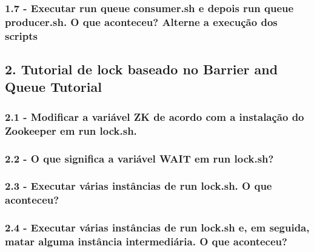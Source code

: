\subsubsection{1.7 - Executar run queue consumer.sh e depois run queue producer.sh.
O que aconteceu? Alterne a execução dos scripts}

\subsection*{2. Tutorial de lock baseado no Barrier and Queue Tutorial}

\subsubsection{2.1 - Modificar a variável ZK de acordo com a instalação do Zookeeper em run lock.sh.}

\subsubsection{2.2 - O que significa a variável WAIT em run lock.sh?}

\subsubsection{2.3 - Executar várias instâncias de run lock.sh. O que aconteceu?}

\subsubsection{2.4 - Executar várias instâncias de run lock.sh e, em seguida, matar
alguma instância intermediária. O que aconteceu?}
